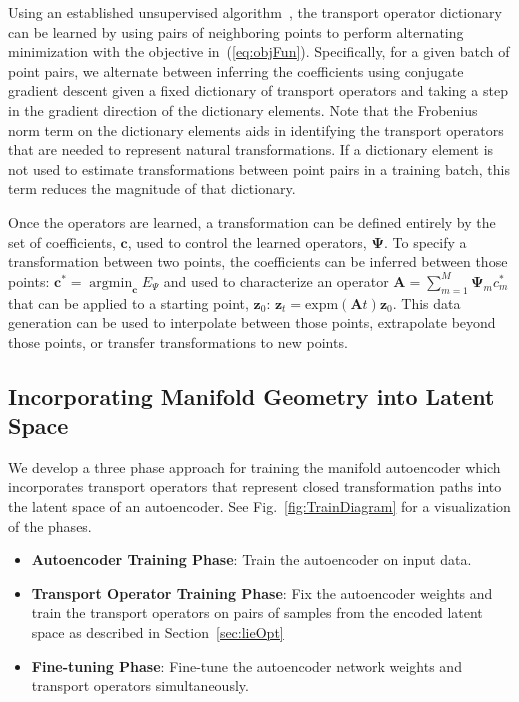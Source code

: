 \documentclass[letterpaper]{article} %
\newcommand{\mtx}[1]{\ensuremath{\mathbf{#1}}}
\newcommand{\vtr}[1]{\ensuremath{\mathbf{#1}}}
\newcommand{\argmin}{\mathop{\mathrm{argmin}}}
\begin{document}
Using an established unsupervised algorithm~\cite{culpepper2009learning}, the transport operator dictionary can be learned by using pairs of neighboring points to perform alternating minimization with the objective in~(\ref{eq:objFun}). Specifically, for a given batch of point pairs, we alternate between inferring the coefficients using conjugate gradient descent given a fixed dictionary of transport operators and taking a step in the gradient direction of the dictionary elements. Note that the Frobenius norm term on the dictionary elements aids in identifying the transport operators that are needed to represent natural transformations. If a dictionary element is not used to estimate transformations between point pairs in a training batch, this term reduces the magnitude of that dictionary.

Once the operators are learned, a transformation can be defined entirely by the set of coefficients, $\vtr{c}$, used to control the learned operators, $\mtx{\Psi}$. To specify a transformation between two points, the coefficients can be inferred between those points: $\vtr{c}^* =  \argmin_\vtr{c}E_{\Psi}$ and used to characterize an operator $\mtx{A} = \sum_{m=1}^M{\mtx{\Psi}_mc^*_{m}}$ that can be applied to a starting point, $\vtr{z}_0$: $\vtr{z}_t = \mathrm{expm}(\mtx{A}t)\vtr{z}_0$. This data generation can be used to interpolate between those points, extrapolate beyond those points, or transfer transformations to new points.

\subsection{Incorporating Manifold Geometry into Latent Space}\label{subsec:manigeo}
We develop a three phase approach for training the manifold autoencoder which incorporates transport operators that represent closed transformation paths into the latent space of an autoencoder. See Fig.~\ref{fig:TrainDiagram} for a visualization of the phases.
\begin{itemize}
    \item \textbf{Autoencoder Training Phase}: Train the autoencoder on input data.
    \item \textbf{Transport Operator Training Phase}: Fix the autoencoder weights and train the transport operators on pairs of samples from the encoded latent space as described in Section~\ref{sec:lieOpt}
    \item \textbf{Fine-tuning Phase}: Fine-tune the autoencoder network weights and transport operators simultaneously.
\end{itemize}
\end{document}
